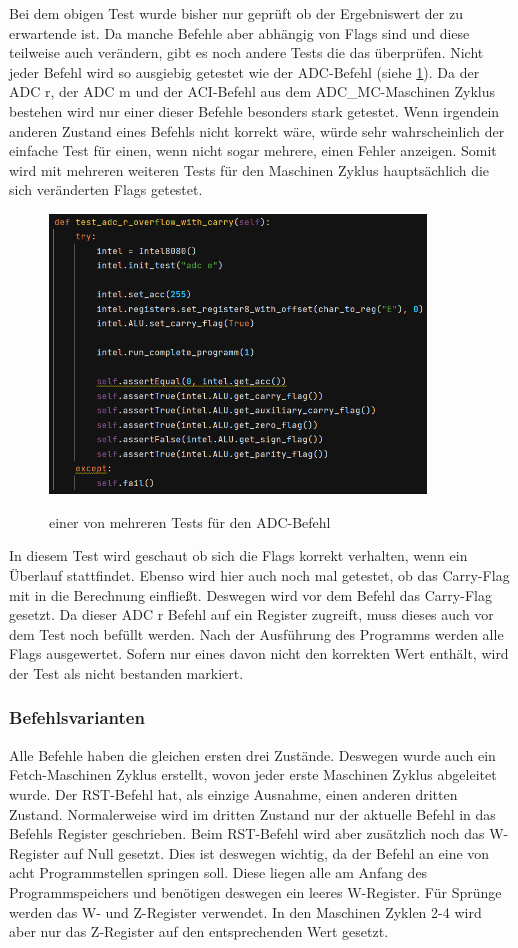 \documentclass[12pt]{article}
\newcommand{\imgSpaceBefore}{\\[0.2cm]}
\begin{document}
\noindent
Bei dem obigen Test wurde bisher nur geprüft ob der Ergebniswert der zu erwartende ist. Da manche Befehle aber abhängig von Flags sind und diese teilweise auch verändern, gibt es noch andere Tests die das überprüfen. Nicht jeder Befehl wird so ausgiebig getestet wie der ADC-Befehl (siehe \ref{fig:test_adc}). Da der ADC r, der ADC m und der ACI-Befehl aus dem ADC\_MC-Maschinen Zyklus bestehen wird nur einer dieser Befehle besonders stark getestet. Wenn irgendein anderen Zustand eines Befehls nicht korrekt wäre, würde sehr wahrscheinlich der einfache Test für einen, wenn nicht sogar mehrere, einen Fehler anzeigen. Somit wird mit mehreren weiteren Tests für den Maschinen Zyklus hauptsächlich die sich veränderten Flags getestet.
\imgSpaceBefore
\begin{figure}[H]
\caption{einer von mehreren Tests für den ADC-Befehl}
\centering
\includegraphics[width=10cm]{bilder/test_adc}
\label{fig:test_adc}
\end{figure}

\noindent
In diesem Test wird geschaut ob sich die Flags korrekt verhalten, wenn ein Überlauf stattfindet. Ebenso wird hier auch noch mal getestet, ob das Carry-Flag mit in die Berechnung einfließt. Deswegen wird vor dem Befehl das Carry-Flag gesetzt. Da dieser ADC r Befehl auf ein Register zugreift, muss dieses auch vor dem Test noch befüllt werden. Nach der Ausführung des Programms werden alle Flags ausgewertet. Sofern nur eines davon nicht den korrekten Wert enthält, wird der Test als nicht bestanden markiert.


\subsubsection{Befehlsvarianten}
Alle Befehle haben die gleichen ersten drei Zustände. Deswegen wurde auch ein Fetch-Maschinen Zyklus erstellt, wovon jeder erste Maschinen Zyklus abgeleitet wurde. Der RST-Befehl hat, als einzige Ausnahme, einen anderen dritten Zustand. Normalerweise wird im dritten Zustand nur der aktuelle Befehl in das Befehls Register geschrieben. Beim RST-Befehl wird aber zusätzlich noch das W-Register auf Null gesetzt. Dies ist deswegen wichtig, da der Befehl an eine von acht Programmstellen springen soll. Diese liegen alle am Anfang des Programmspeichers und benötigen deswegen ein leeres W-Register. Für Sprünge werden das W- und Z-Register verwendet. In den Maschinen Zyklen 2-4 wird aber nur das Z-Register auf den entsprechenden Wert gesetzt.
\\
\end{document}
